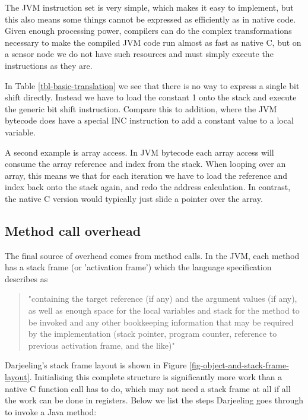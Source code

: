 The JVM instruction set is very simple, which makes it easy to implement, but this also means some things cannot be expressed as efficiently as in native code. Given enough processing power, compilers can do the complex transformations necessary to make the compiled JVM code run almost as fast as native C, but on a sensor node we do not have such resources and must simply execute the instructions as they are.

In Table \ref{tbl-basic-translation} we see that there is no way to express a single bit shift directly. Instead we have to load the constant 1 onto the stack and execute the generic bit shift instruction. Compare this to addition, where the JVM bytecode does have a special INC instruction to add a constant value to a local variable.

A second example is array access. In JVM bytecode each array access will consume the array reference and index from the stack. When looping over an array, this means we that for each iteration we have to load the reference and index back onto the stack again, and redo the address calculation. In contrast, the native C version would typically just slide a pointer over the array.

\subsection{Method call overhead}
\label{sec-overhead-method-call}
The final source of overhead comes from method calls. In the JVM, each method has a stack frame (or 'activation frame') which the language specification describes as
\begin{quotation}
"containing the target reference (if any) and the argument values (if any), as well as enough space for the local variables and stack for the method to be invoked and any other bookkeeping information that may be required by the implementation (stack pointer, program counter, reference to previous activation frame, and the like)" \cite{Gosling:2014}
\end{quotation}

Darjeeling's stack frame layout is shown in Figure \ref{fig-object-and-stack-frame-layout}. Initialising this complete structure is significantly more work than a native C function call has to do, which may not need a stack frame at all if all the work can be done in registers. Below we list the steps Darjeeling goes through to invoke a Java method:

